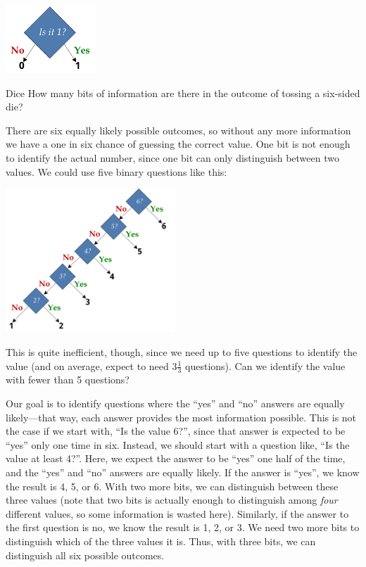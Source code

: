 \begin{center}
\includegraphics[height=1.0in]{figures/onebit.pdf} 
\end{center}

\begin{example}{Dice} How many bits of information are there in the outcome of tossing a six-sided die?

There are six equally likely possible outcomes, so without any more information we have a one in six chance of guessing the correct value.  One bit is not enough to identify the actual number, since one bit can only distinguish between two values.  We could use five binary questions like this:

\begin{center}
\includegraphics[width=2.5in]{figures/sixchoices.pdf} 
\end{center}

This is quite inefficient, though, since we need up to five questions to identify the value (and on average, expect to need $3\frac{1}{3}$ questions).  Can we identify the value with fewer than 5 questions?

Our goal is to identify questions where the ``yes'' and ``no'' answers are equally likely---that way, each answer provides the most information possible.  This is not the case if we start with, ``Is the value 6?'', since that answer is expected to be ``yes'' only one time in six.  Instead, we should start with a question like, ``Is the value at least 4?''.  Here, we expect the answer to be ``yes'' one half of the time, and the ``yes'' and ``no'' answers are equally likely.  If the answer is ``yes'', we know the result is 4, 5, or 6.  With two more bits, we can distinguish between these three values (note that two bits is actually enough to distinguish among {\em four} different values, so some information is wasted here).  Similarly, if the answer to the first question is no, we know the result is 1, 2, or 3.  We need two more bits to distinguish which of the three values it is.  Thus, with three bits, we can distinguish all six possible outcomes.  


\end{example}
